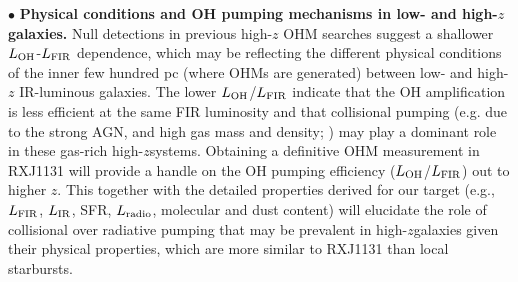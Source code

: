 \documentclass[letterpaper,11pt]{article}
\newcommand{\LIR}{\mbox{$L_{\rm IR}$}\xspace}
\newcommand{\LFIR}{\mbox{$L_{\rm FIR}$}\xspace}
\newcommand{\LOH}{$L_{\rm OH}$\xspace}
\newcommand{\ssim}{\,$\sim$\,}
\newcommand{\highz}{high-$z$\space}
\begin{document}
%
\noindent $\bullet$ {\bf Physical conditions and OH pumping mechanisms in low- and high-$z$ galaxies.}
Null detections in previous high-$z$ OHM searches suggest a shallower \LOH-\LFIR dependence, which may be
reflecting the different physical conditions of the inner few hundred pc (where OHMs are generated)
between low- and high-$z$ IR-luminous galaxies.
The lower \LOH/\LFIR indicate that the OH amplification is less efficient at the same FIR luminosity
and that collisional pumping (e.g. due to the strong AGN, and high gas mass and density; \citealt{Field94a}) %
%
may play a dominant role in these gas-rich \highz systems.
Obtaining a definitive OHM measurement in RXJ1131 will provide a handle on the OH pumping efficiency (\LOH/\LFIR) out to higher $z$.
This together with the detailed properties derived for our target (e.g., \LFIR, \LIR, SFR, $L_{\rm radio}$, molecular and dust content)
will elucidate the role of collisional over radiative pumping
that may be prevalent in \highz galaxies given their physical properties, which are more similar to RXJ1131 than
local starbursts. %
\end{document}
